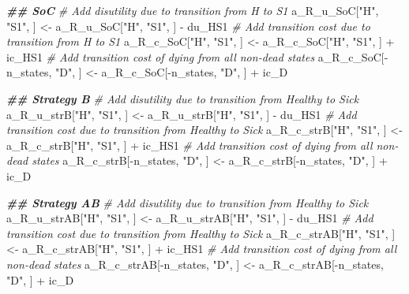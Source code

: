 \documentclass[
]{article}
\newenvironment{Shaded}{\begin{snugshade}}{\end{snugshade}}
\newcommand{\CommentTok}[1]{\textcolor[rgb]{0.56,0.35,0.01}{\textit{#1}}}
\newcommand{\DocumentationTok}[1]{\textcolor[rgb]{0.56,0.35,0.01}{\textbf{\textit{#1}}}}
\newcommand{\NormalTok}[1]{#1}
\newcommand{\OtherTok}[1]{\textcolor[rgb]{0.56,0.35,0.01}{#1}}
\newcommand{\SpecialCharTok}[1]{\textcolor[rgb]{0.00,0.00,0.00}{#1}}
\newcommand{\StringTok}[1]{\textcolor[rgb]{0.31,0.60,0.02}{#1}}
\begin{document}
\begin{Shaded}
\begin{Highlighting}[]
\DocumentationTok{\#\# SoC}
\CommentTok{\# Add disutility due to transition from H to S1}
\NormalTok{a\_R\_u\_SoC[}\StringTok{"H"}\NormalTok{, }\StringTok{"S1"}\NormalTok{, ] }\OtherTok{\textless{}{-}}\NormalTok{ a\_R\_u\_SoC[}\StringTok{"H"}\NormalTok{, }\StringTok{"S1"}\NormalTok{, ] }\SpecialCharTok{{-}}\NormalTok{ du\_HS1}
\CommentTok{\# Add transition cost due to transition from H to S1}
\NormalTok{a\_R\_c\_SoC[}\StringTok{"H"}\NormalTok{, }\StringTok{"S1"}\NormalTok{, ] }\OtherTok{\textless{}{-}}\NormalTok{ a\_R\_c\_SoC[}\StringTok{"H"}\NormalTok{, }\StringTok{"S1"}\NormalTok{, ] }\SpecialCharTok{+}\NormalTok{ ic\_HS1}
\CommentTok{\# Add transition cost of dying from all non{-}dead states}
\NormalTok{a\_R\_c\_SoC[}\SpecialCharTok{{-}}\NormalTok{n\_states, }\StringTok{"D"}\NormalTok{, ] }\OtherTok{\textless{}{-}}\NormalTok{ a\_R\_c\_SoC[}\SpecialCharTok{{-}}\NormalTok{n\_states, }\StringTok{"D"}\NormalTok{, ] }\SpecialCharTok{+}\NormalTok{ ic\_D}

\DocumentationTok{\#\# Strategy B}
\CommentTok{\# Add disutility due to transition from Healthy to Sick}
\NormalTok{a\_R\_u\_strB[}\StringTok{"H"}\NormalTok{, }\StringTok{"S1"}\NormalTok{, ] }\OtherTok{\textless{}{-}}\NormalTok{ a\_R\_u\_strB[}\StringTok{"H"}\NormalTok{, }\StringTok{"S1"}\NormalTok{, ] }\SpecialCharTok{{-}}\NormalTok{ du\_HS1}
\CommentTok{\# Add transition cost due to transition from Healthy to Sick}
\NormalTok{a\_R\_c\_strB[}\StringTok{"H"}\NormalTok{, }\StringTok{"S1"}\NormalTok{, ] }\OtherTok{\textless{}{-}}\NormalTok{ a\_R\_c\_strB[}\StringTok{"H"}\NormalTok{, }\StringTok{"S1"}\NormalTok{, ] }\SpecialCharTok{+}\NormalTok{ ic\_HS1}
\CommentTok{\# Add transition cost of dying from all non{-}dead states}
\NormalTok{a\_R\_c\_strB[}\SpecialCharTok{{-}}\NormalTok{n\_states, }\StringTok{"D"}\NormalTok{, ] }\OtherTok{\textless{}{-}}\NormalTok{ a\_R\_c\_strB[}\SpecialCharTok{{-}}\NormalTok{n\_states, }\StringTok{"D"}\NormalTok{, ] }\SpecialCharTok{+}\NormalTok{ ic\_D}

\DocumentationTok{\#\# Strategy AB}
\CommentTok{\# Add disutility due to transition from Healthy to Sick}
\NormalTok{a\_R\_u\_strAB[}\StringTok{"H"}\NormalTok{, }\StringTok{"S1"}\NormalTok{, ] }\OtherTok{\textless{}{-}}\NormalTok{ a\_R\_u\_strAB[}\StringTok{"H"}\NormalTok{, }\StringTok{"S1"}\NormalTok{, ] }\SpecialCharTok{{-}}\NormalTok{ du\_HS1}
\CommentTok{\# Add transition cost due to transition from Healthy to Sick}
\NormalTok{a\_R\_c\_strAB[}\StringTok{"H"}\NormalTok{, }\StringTok{"S1"}\NormalTok{, ] }\OtherTok{\textless{}{-}}\NormalTok{ a\_R\_c\_strAB[}\StringTok{"H"}\NormalTok{, }\StringTok{"S1"}\NormalTok{, ] }\SpecialCharTok{+}\NormalTok{ ic\_HS1}
\CommentTok{\# Add transition cost of dying from all non{-}dead states}
\NormalTok{a\_R\_c\_strAB[}\SpecialCharTok{{-}}\NormalTok{n\_states, }\StringTok{"D"}\NormalTok{, ] }\OtherTok{\textless{}{-}}\NormalTok{ a\_R\_c\_strAB[}\SpecialCharTok{{-}}\NormalTok{n\_states, }\StringTok{"D"}\NormalTok{, ] }\SpecialCharTok{+}\NormalTok{ ic\_D}
\end{Highlighting}
\end{Shaded}
\end{document}
